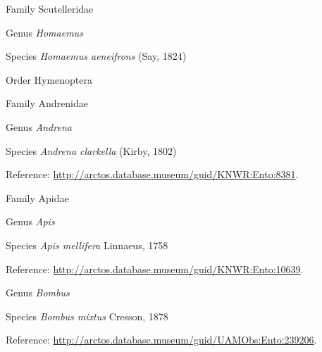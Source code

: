 \documentclass[9pt, article]{memoir}
\begin{document}
\begin{multicols}{2}
\vspace{6pt}\noindent\hspace{24pt}Family Scutelleridae


\vspace{6pt}\noindent\hspace{30pt}Genus \textit{Homaemus}


\vspace{6pt}\noindent\hspace{36pt}Species \textit{Homaemus aeneifrons} (Say, 1824)


\vspace{6pt}\noindent\hspace{18pt}Order Hymenoptera


\vspace{6pt}\noindent\hspace{24pt}Family Andrenidae


\vspace{6pt}\noindent\hspace{30pt}Genus \textit{Andrena}


\vspace{6pt}\noindent\hspace{36pt}Species \textit{Andrena clarkella} (Kirby, 1802)


\vspace{6pt}Reference: 
\url{http://arctos.database.museum/guid/KNWR:Ento:8381}.

\vspace{6pt}\noindent\hspace{24pt}Family Apidae


\vspace{6pt}\noindent\hspace{30pt}Genus \textit{Apis}


\vspace{6pt}\noindent\hspace{36pt}Species \textit{Apis mellifera} Linnaeus, 1758


\vspace{6pt}Reference: 
\url{http://arctos.database.museum/guid/KNWR:Ento:10639}.

\vspace{6pt}\noindent\hspace{30pt}Genus \textit{Bombus}


\vspace{6pt}\noindent\hspace{36pt}Species \textit{Bombus mixtus} Cresson, 1878


\vspace{6pt}Reference: 
\url{http://arctos.database.museum/guid/UAMObs:Ento:239206}.


\end{multicols}
\end{document}

